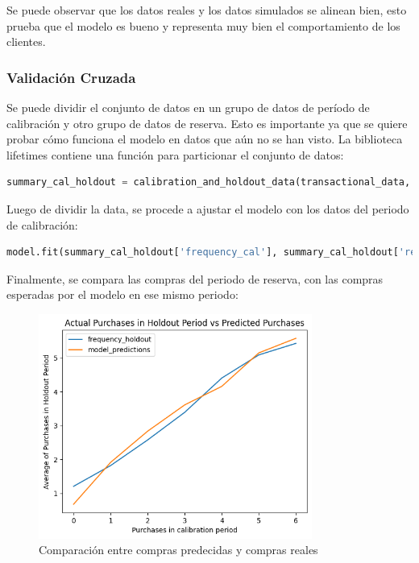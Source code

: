 Se puede observar que los datos reales y los datos simulados se alinean bien, esto prueba que el modelo es bueno y representa muy bien el comportamiento de los clientes.

\subsubsection{Validación Cruzada}

Se puede dividir el conjunto de datos en un grupo de datos de período de calibración y otro grupo de datos de reserva. Esto es importante ya que se quiere probar cómo funciona el modelo en datos que aún no se han visto. La biblioteca lifetimes contiene una función para particionar el conjunto de datos:

\begin{lstlisting}[language=Python, caption=Validación en modelo.ipynb]
summary_cal_holdout = calibration_and_holdout_data(transactional_data, 'CustomerNo', 'Date',                                            calibration_period_end='2019-06-09', observation_period_end='2019-12-09')
\end{lstlisting}

Luego de dividir la data, se procede a ajustar el modelo con los datos del periodo de calibración:

\begin{lstlisting}[language=Python, caption=Validación en modelo.ipynb]
model.fit(summary_cal_holdout['frequency_cal'], summary_cal_holdout['recency_cal'], summary_cal_holdout['T_cal'])
\end{lstlisting}

Finalmente, se compara las compras del periodo de reserva, con las compras esperadas por el modelo en ese mismo periodo:

\begin{figure}[H]
	\centering \includegraphics[width=0.80\textwidth]{images/comparacion.png}
	\caption{Comparación entre compras predecidas y compras reales}
	\label{fig:comp}
\end{figure}

